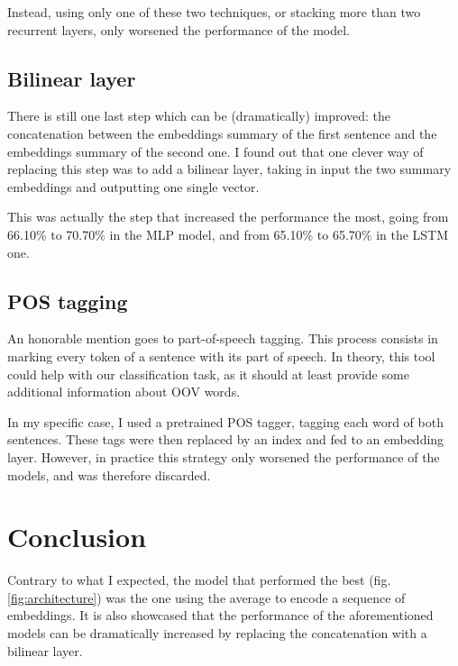 \documentclass[11pt,a4paper]{article}
\begin{document}
	 Instead, using only one of these two techniques, or stacking more than two recurrent layers, only worsened the performance of the model.
	
	\subsection{Bilinear layer}
	There is still one last step which can be (dramatically) improved: the concatenation between the embeddings summary of the first sentence and the embeddings summary of the second one. I found out that one clever way of replacing this step was to add a bilinear layer, taking in input the two summary embeddings and outputting one single vector.
	
	This was actually the step that increased the performance the most, going from 66.10\% to 70.70\% in the MLP model, and from 65.10\% to 65.70\% in the LSTM one.
	
	\subsection{POS tagging}
	An honorable mention goes to part-of-speech tagging. This process consists in marking every token of a sentence with its part of speech. In theory, this tool could help with our classification task, as it should at least provide some additional information about OOV words.
	
	In my specific case, I used a pretrained POS tagger, tagging each word of both sentences. These tags were then replaced by an index and fed to an embedding layer. However, in practice this strategy only worsened the performance of the models, and was therefore discarded.
	
	\section{Conclusion}
	Contrary to what I expected, the model that performed the best (fig. \ref{fig:architecture}) was the one using the average to encode a sequence of embeddings. It is also showcased that the performance of the aforementioned models can be dramatically increased by replacing the concatenation with a bilinear layer.
	\clearpage
\end{document}
